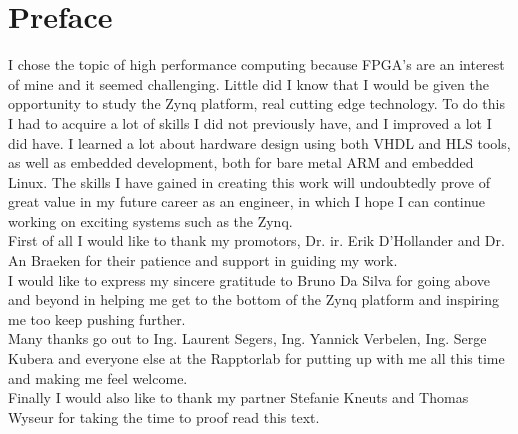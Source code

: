 

\chapter*{Preface}


I chose the topic of high performance computing because FPGA's are an interest of mine and it seemed challenging. Little did I know that I would be given the opportunity to study the Zynq platform, real cutting edge technology. To do this I had to acquire a lot of skills I did not previously have, and I improved a lot I did have. I learned a lot about hardware design using both VHDL and HLS tools, as well as embedded development, both for bare metal ARM and embedded Linux. The skills I have gained in creating this work will undoubtedly prove of great value in my future career as an engineer, in which I hope I can continue working on exciting systems such as the Zynq. \\

First of all I would like to thank my promotors, Dr. ir. Erik D'Hollander and Dr. An Braeken for their patience and support in guiding my work.\\

I would like to express my sincere gratitude to Bruno Da Silva for going above and beyond in helping me get to the bottom of the Zynq platform and inspiring me too keep pushing further. \\

Many thanks go out to Ing. Laurent Segers, Ing. Yannick Verbelen, Ing. Serge Kubera and everyone else at the Rapptorlab for putting up with me all this time and making me feel welcome.\\

Finally I would also like to thank my partner Stefanie Kneuts and Thomas Wyseur for taking the time to proof read this text. 



